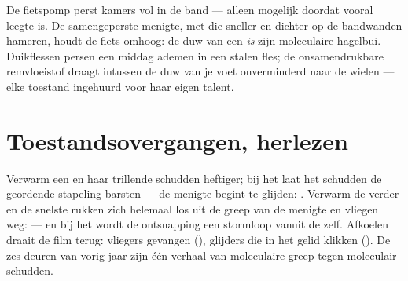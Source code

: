 \begin{example}\label{ex:g7:states-of-matter:squeezed}
De fietspomp perst kamers vol  in de band --- alleen mogelijk
doordat  vooral leegte is. De samengeperste menigte, met
 die sneller en dichter op de bandwanden hameren, houdt de
fiets omhoog: de duw van een  \emph{is} zijn moleculaire hagelbui.
Duikflessen persen een middag ademen in een stalen fles; de
onsamendrukbare remvloeistof draagt intussen de duw van je voet
onverminderd naar de wielen --- elke toestand ingehuurd voor haar
eigen talent.
\end{example}

\section{Toestandsovergangen, herlezen}

\begin{example}\label{ex:g7:states-of-matter:doors}
Verwarm een  en haar trillende  schudden
heftiger; bij het  laat het schudden de geordende stapeling
barsten --- de menigte begint te glijden: . Verwarm de
 verder en de snelste  rukken zich helemaal los uit
de greep van de menigte en vliegen weg:  --- en bij het
 wordt de ontsnapping een stormloop vanuit de
 zelf. Afkoelen draait de film terug: vliegers gevangen
(), glijders die in het gelid klikken
(). De zes deuren van vorig jaar zijn één verhaal van
moleculaire greep tegen moleculair schudden.
\end{example}

